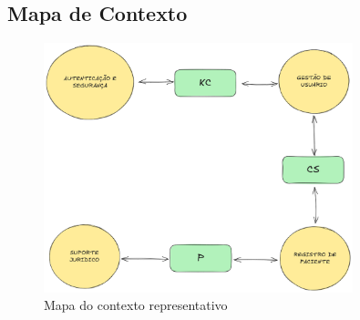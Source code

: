 \begin{titlepage}
    \section{Mapa de Contexto}    
    \begin{figure}[H]
        \centering
        \includegraphics[width=0.8\textwidth]{image/mapa_contexto_exemplo.png}
        \caption{Mapa do contexto representativo}
        \label{fig:minha_imagem}
    \end{figure}

\end{titlepage}